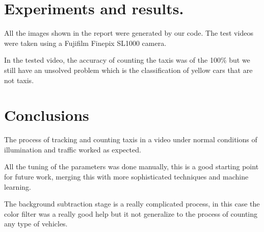 \documentclass[journal]{IEEEtran}
\begin{document}
\section{Experiments and results.}

All the images shown in the report were generated by our code. The test videos
were taken using a Fujifilm Finepix SL1000 camera.

In the tested video, the accuracy of counting the taxis was of the 100\% but
we still have an unsolved problem which is the classification of yellow cars that
are not taxis.

\section{Conclusions}

The process of tracking and counting taxis in a video under normal conditions
of illumination and traffic worked as expected.

All the tuning of the parameters was done manually, this is a good starting
point for future work, merging this with more sophisticated techniques and
machine learning.

The background subtraction stage is a really complicated process, in this
case the color filter was a really good help but it not generalize to the
process of counting any type of vehicles.




\end{document}
